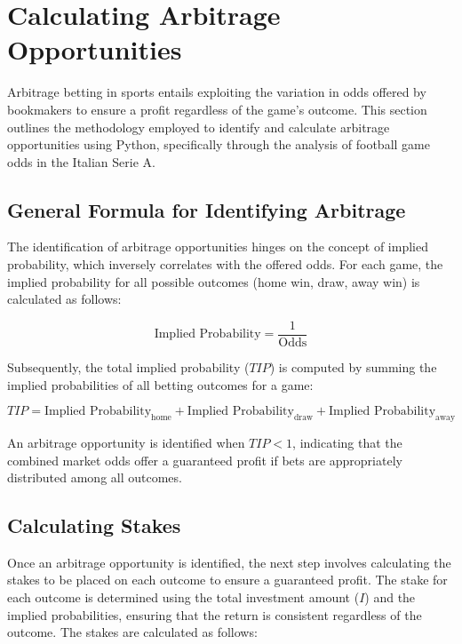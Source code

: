 \documentclass[11pt, a4paper, leqno]{article}
\begin{document}

\section{Calculating Arbitrage Opportunities} %
\label{sec:calculating_arbitrage_opportunities}

Arbitrage betting in sports entails exploiting the variation in odds offered by bookmakers to ensure a profit regardless of the game's outcome. This section outlines the methodology employed to identify and calculate arbitrage opportunities using Python, specifically through the analysis of football game odds in the Italian Serie A.

\subsection{General Formula for Identifying Arbitrage}
The identification of arbitrage opportunities hinges on the concept of implied probability, which inversely correlates with the offered odds. For each game, the implied probability for all possible outcomes (home win, draw, away win) is calculated as follows:

\begin{equation}
    \text{Implied Probability} = \frac{1}{\text{Odds}}
\end{equation}

Subsequently, the total implied probability (\(TIP\)) is computed by summing the implied probabilities of all betting outcomes for a game:

\begin{equation}
    TIP = \text{Implied Probability}_{\text{home}} + \text{Implied Probability}_{\text{draw}} + \text{Implied Probability}_{\text{away}}
\end{equation}

An arbitrage opportunity is identified when \(TIP < 1\), indicating that the combined market odds offer a guaranteed profit if bets are appropriately distributed among all outcomes.

\subsection{Calculating Stakes} %
Once an arbitrage opportunity is identified, the next step involves calculating the stakes to be placed on each outcome to ensure a guaranteed profit. The stake for each outcome is determined using the total investment amount (\(I\)) and the implied probabilities, ensuring that the return is consistent regardless of the outcome. The stakes are calculated as follows:
\end{document}
